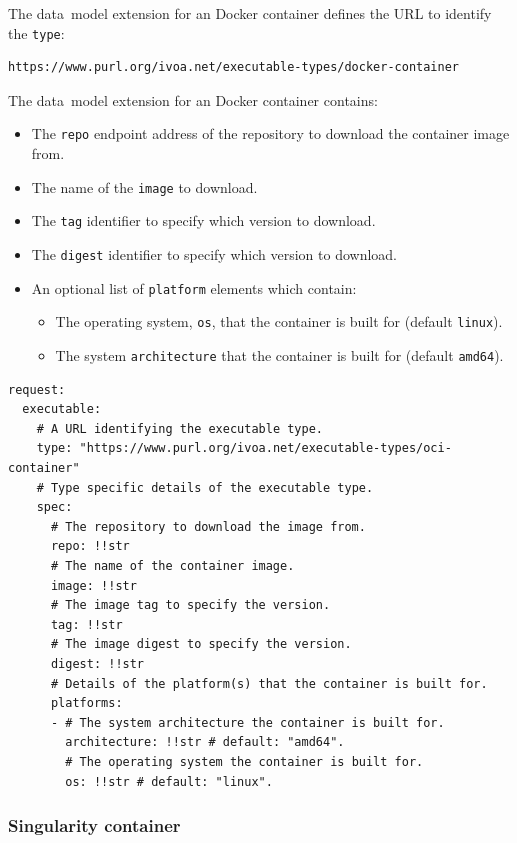 \documentclass[11pt,a4paper]{ivoa}
\newcommand{\datamodel} {data~model}
\newcommand{\dockercontainer} {Docker container}
\newcommand{\codeword}[1] {\texttt{#1}}
\begin{document}
The \datamodel{} extension for an \dockercontainer{} defines the URL
to identify the \codeword{type}:
\begin{lstlisting}[]
https://www.purl.org/ivoa.net/executable-types/docker-container
\end{lstlisting}
\hfill \break
The \datamodel{} extension for an \dockercontainer{} contains:
\begin{itemize}
    \item The \codeword{repo} endpoint address of the repository to download the container image from.
    \item The name of the \codeword{image} to download.
    \item The \codeword{tag} identifier to specify which version to download.
    \item The \codeword{digest} identifier to specify which version to download.
    \item An optional list of \codeword{platform} elements which contain:
    \begin{itemize}
        \item The operating system, \codeword{os}, that the container is built for (default \codeword{linux}).
        \item The system \codeword{architecture} that the container is built for (default \codeword{amd64}).
    \end{itemize}


\end{itemize}

\begin{lstlisting}[]
request:
  executable:
    # A URL identifying the executable type.
    type: "https://www.purl.org/ivoa.net/executable-types/oci-container"
    # Type specific details of the executable type.
    spec:
      # The repository to download the image from.
      repo: !!str
      # The name of the container image.
      image: !!str
      # The image tag to specify the version.
      tag: !!str
      # The image digest to specify the version.
      digest: !!str
      # Details of the platform(s) that the container is built for.
      platforms:
      - # The system architecture the container is built for.
        architecture: !!str # default: "amd64".
        # The operating system the container is built for.
        os: !!str # default: "linux".
\end{lstlisting}

\subsubsection{Singularity container}
\label{datamodel-singularity-container}
\end{document}

